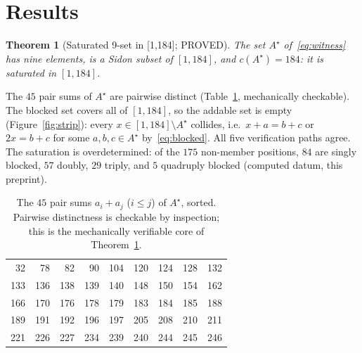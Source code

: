\documentclass[11pt,a4paper]{article}
\newtheorem{theorem}{Theorem}
\theoremstyle{definition}
\begin{document}
\section{Results}

\begin{theorem}[Saturated 9-set in {[1,184]}; PROVED]
  \label{thm:main}
  The set $A^\star$ of~\eqref{eq:witness} has nine elements, is a
  Sidon subset of $[1,184]$, and
  $c(A^\star)=184$: it is saturated in $[1,184]$.
\end{theorem}

The $45$ pair sums of $A^\star$ are pairwise distinct
(Table~\ref{tab:pairsums}, mechanically checkable). The blocked set
covers all of $[1,184]$, so the addable set is empty
(Figure~\ref{fig:strip}): every $x\in[1,184]\setminus A^\star$ collides,
i.e.\ $x+a=b+c$ or $2x=b+c$ for some $a,b,c\in A^\star$
by~\eqref{eq:blocked}. All five verification paths agree. The saturation
is overdetermined: of the $175$ non-member positions, $84$ are singly
blocked, $57$ doubly, $29$ triply, and $5$ quadruply blocked (computed
datum, this preprint).

\begin{table}[t]
  \centering
  \caption{The $45$ pair sums $a_i+a_j$ ($i\le j$) of $A^\star$,
    sorted. Pairwise distinctness is checkable by inspection; this is
    the mechanically verifiable core of Theorem~\ref{thm:main}.}
  \label{tab:pairsums}
  \begin{tabular}{*{9}{r}}
    \toprule
    32 & 78 & 82 & 90 & 104 & 120 & 124 & 128 & 132 \\
    133 & 136 & 138 & 139 & 140 & 148 & 150 & 154 & 162 \\
    166 & 170 & 176 & 178 & 179 & 183 & 184 & 185 & 188 \\
    189 & 191 & 192 & 196 & 197 & 205 & 208 & 210 & 211 \\
    221 & 226 & 227 & 234 & 239 & 240 & 244 & 245 & 246 \\
    \bottomrule
  \end{tabular}
\end{table}
\end{document}
